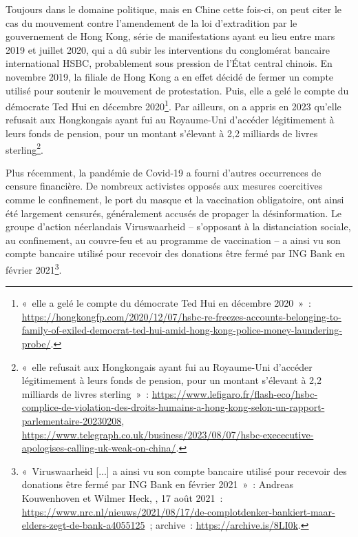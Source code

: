 
Toujours dans le domaine politique, mais en Chine cette fois-ci, on peut citer le cas du mouvement contre l'amendement de la loi d'extradition par le gouvernement de Hong Kong, série de manifestations ayant eu lieu entre mars 2019 et juillet 2020, qui a dû subir les interventions du conglomérat bancaire international HSBC, probablement sous pression de l'État central chinois. En novembre 2019, la filiale de Hong Kong a en effet décidé de fermer un compte utilisé pour soutenir le mouvement de protestation. Puis, elle a gelé le compte du démocrate Ted Hui en décembre 2020\footnote{«~elle a gelé le compte du démocrate Ted Hui en décembre 2020~»~: \url{https://hongkongfp.com/2020/12/07/hsbc-re-freezes-accounts-belonging-to-family-of-exiled-democrat-ted-hui-amid-hong-kong-police-money-laundering-probe/}.}. Par ailleurs, on a appris en 2023 qu'elle refusait aux Hongkongais ayant fui au Royaume-Uni d'accéder légitimement à leurs fonds de pension, pour un montant s'élevant à 2,2 milliards de livres sterling\footnote{«~elle refusait aux Hongkongais ayant fui au Royaume-Uni d'accéder légitimement à leurs fonds de pension, pour un montant s'élevant à 2,2 milliards de livres sterling~»~: \url{https://www.lefigaro.fr/flash-eco/hsbc-complice-de-violation-des-droits-humains-a-hong-kong-selon-un-rapport-parlementaire-20230208}, \url{https://www.telegraph.co.uk/business/2023/08/07/hsbc-exececutive-apologises-calling-uk-weak-on-china/}.}.

Plus récemment, la pandémie de Covid-19 a fourni d'autres occurrences de censure financière. De nombreux activistes opposés aux mesures coercitives comme le confinement, le port du masque et la vaccination obligatoire, ont ainsi été largement censurés, généralement accusés de propager la désinformation. Le groupe d'action néerlandais Viruswaarheid -- s'opposant à la distanciation sociale, au confinement, au couvre-feu et au programme de vaccination -- a ainsi vu son compte bancaire utilisé pour recevoir des donations être fermé par ING Bank en février 2021\footnote{«~Viruswaarheid [...] a ainsi vu son compte bancaire utilisé pour recevoir des donations être fermé par ING Bank en février 2021~»~: Andreas Kouwenhoven et Wilmer Heck, , 17 août 2021~: \url{https://www.nrc.nl/nieuws/2021/08/17/de-complotdenker-bankiert-maar-elders-zegt-de-bank-a4055125}~; archive~: \url{https://archive.is/8LI0k}.}.


